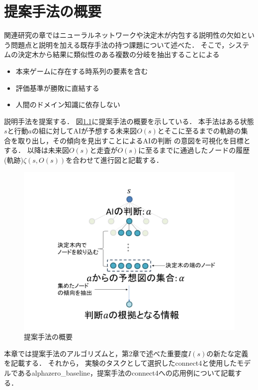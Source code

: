 \chapter{提案手法の概要}
関連研究の章ではニューラルネットワークや決定木が内包する説明性の欠如という問題点と説明を加える既存手法の持つ課題について述べた．
そこで，システムの決定木から結果に類似性のある複数の分岐を抽出することによる
\begin{itemize}
	\item 本来ゲームに存在する時系列の要素を含む
	\item 評価基準が勝敗に直結する
    \item 人間のドメイン知識に依存しない
\end{itemize}
説明手法を提案する．
図\ref{fig:mabs}に提案手法の概要を示している．
本手法はある状態$s$と行動$a$の組に対してAIが予想する未来図$O(s)$とそこに至るまでの軌跡の集合を取り出し，その傾向を見出すことによるAIの判断
の意図を可視化を目標とする．
以降は未来図$O(s)$と走査が$O(s)$に至るまでに通過したノードの履歴(軌跡)$\zeta(s, O(s))$を合わせて進行図と記載する．
\begin{figure}[htbp]
    \centering
    \includegraphics[width=\linewidth]{./figure/mabs.png}
    \caption{提案手法の概要}
    \label{fig:mabs}
\end{figure}
本章では提案手法のアルゴリズムと，第2章で述べた重要度$I(s)$の新たな定義を記載する．
それから，
実験のタスクとして選択したconnect4と使用したモデルであるalphazero\_baseline，提案手法のconnect4への応用例について記載する．


